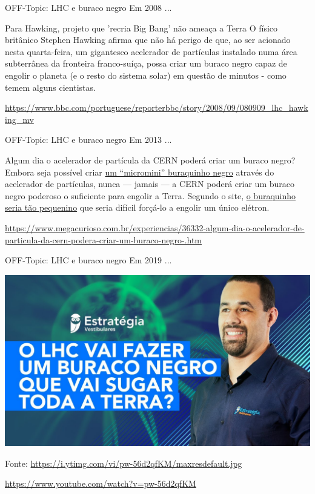 \documentclass[xcolor=dvipsnames,table]{beamer}
\begin{document}
\begin{frame}{OFF-Topic: LHC e buraco negro}
	Em 2008 ...
	\begin{block}{Para Hawking, projeto que 'recria Big Bang' não ameaça a Terra}
	O físico britânico Stephen Hawking afirma que não há perigo de que, ao ser acionado nesta quarta-feira, um gigantesco acelerador de partículas instalado numa área subterrânea da fronteira franco-suíça, possa criar um buraco negro capaz de engolir o planeta (e o resto do sistema solar) em questão de minutos - como temem alguns cientistas.
	\end{block}
	\url{https://www.bbc.com/portuguese/reporterbbc/story/2008/09/080909_lhc_hawking_mv}
\end{frame}

\begin{frame}{OFF-Topic: LHC e buraco negro}	
	Em 2013 ...
	\begin{block}{Algum dia o acelerador de partícula da CERN poderá criar um buraco negro?}
	Embora seja possível criar \underline{um ``micromini'' buraquinho negro} através do acelerador de partículas, nunca — jamais — a CERN poderá criar um buraco negro poderoso o suficiente para engolir a Terra. Segundo o site, \underline{o buraquinho seria tão pequenino} que seria difícil forçá-lo a engolir um único elétron.
	\end{block}
	
	\url{https://www.megacurioso.com.br/experiencias/36332-algum-dia-o-acelerador-de-particula-da-cern-podera-criar-um-buraco-negro-.htm}
\end{frame}

\begin{frame}{OFF-Topic: LHC e buraco negro}
	Em 2019 ...
	\begin{center}
		\includegraphics[scale=0.2]{buraco-negro-2.jpg}
	\end{center}
	Fonte: \url{https://i.ytimg.com/vi/pw-56d2qfKM/maxresdefault.jpg}
	\newline
	
	\url{https://www.youtube.com/watch?v=pw-56d2qfKM}
\end{frame}
\end{document}

